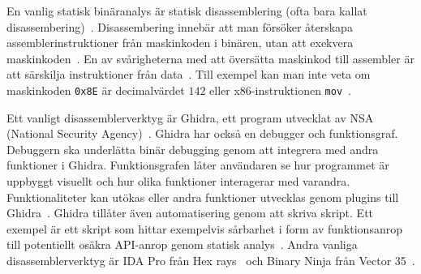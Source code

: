 En vanlig statisk binäranalys är statisk disassemblering (ofta bara kallat
disassembering)~\cite{andriesse2018}. Disassembering innebär att man försöker
återskapa assemblerinstruktioner från maskinkoden i binären, utan att exekvera
maskinkoden~\cite{andriesse2018}. En av svårigheterna med att översätta
maskinkod till assembler är att särskilja instruktioner från
data~\cite{andriesse2018}.  Till exempel kan man inte veta om maskinkoden
\verb|0x8E| är decimalvärdet $142$ eller x86-instruktionen
\verb|mov|~\cite{andriesse2018}.

Ett vanligt disassemblerverktyg är Ghidra, ett program utvecklat av NSA
(National Security Agency)~\cite{ghidra_website}. Ghidra har också en debugger
och funktionsgraf. Debuggern ska underlätta binär debugging genom att
integrera med andra funktioner i Ghidra. Funktionsgrafen låter användaren se
hur programmet är uppbyggt visuellt och hur olika funktioner interagerar med
varandra. Funktionaliteter kan utökas eller andra funktioner utvecklas genom
plugins till Ghidra~\cite{ghidra_use_cases}. Ghidra tillåter även automatisering
genom att skriva skript. Ett exempel är ett skript som hittar exempelvis
sårbarhet i form av funktionsanrop till potentiellt osäkra API-anrop genom
statisk analys~\cite{ghidra_script}. Andra vanliga disassemblerverktyg är
IDA Pro från Hex rays~\cite{hex_rays} och Binary Ninja från Vector
35~\cite{binary_ninja}.
